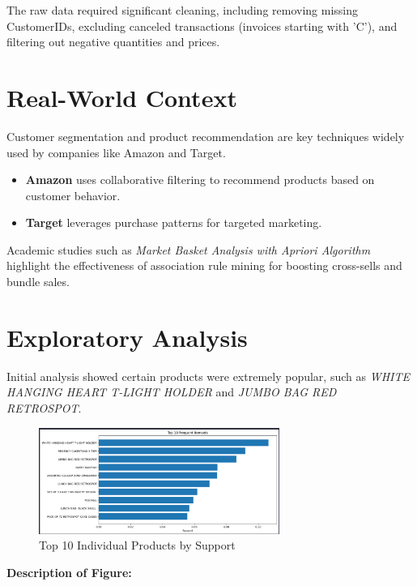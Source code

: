 \documentclass[12pt]{article}
\begin{document}
The raw data required significant cleaning, including removing missing CustomerIDs, excluding canceled transactions (invoices starting with 'C'), and filtering out negative quantities and prices.

\section{Real-World Context}

Customer segmentation and product recommendation are key techniques widely used by companies like Amazon and Target.  
\begin{itemize}
    \item \textbf{Amazon} uses collaborative filtering to recommend products based on customer behavior.
    \item \textbf{Target} leverages purchase patterns for targeted marketing.
\end{itemize}
Academic studies such as \textit{Market Basket Analysis with Apriori Algorithm} highlight the effectiveness of association rule mining for boosting cross-sells and bundle sales.

\section{Exploratory Analysis}

Initial analysis showed certain products were extremely popular, such as \textit{WHITE HANGING HEART T-LIGHT HOLDER} and \textit{JUMBO BAG RED RETROSPOT}.

\begin{figure}[H]
    \centering
    \includegraphics[width=0.7\textwidth]{images/top_10_freq_items.png}
    \caption{Top 10 Individual Products by Support}
\end{figure}


\noindent
\textbf{Description of Figure:} \\
\end{document}
